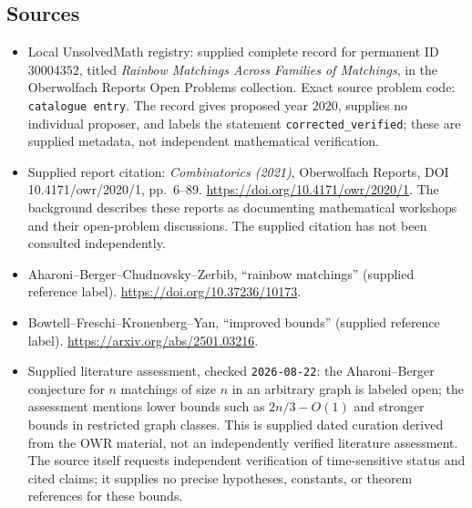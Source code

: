 \documentclass[11pt]{article}
\begin{document}
\subsection{Sources}
\begin{itemize}
\item Local UnsolvedMath registry: supplied complete record for permanent ID \(30004352\), titled \emph{Rainbow Matchings Across Families of Matchings}, in the Oberwolfach Reports Open Problems collection. Exact source problem code: \texttt{catalogue entry}. The record gives proposed year \(2020\), supplies no individual proposer, and labels the statement \texttt{corrected\_verified}; these are supplied metadata, not independent mathematical verification.
\item Supplied report citation: \emph{Combinatorics (2021)}, Oberwolfach Reports, DOI 10.4171/owr/2020/1, pp.\ 6--89. \url{https://doi.org/10.4171/owr/2020/1}. The background describes these reports as documenting mathematical workshops and their open-problem discussions. The supplied citation has not been consulted independently.
\item Aharoni--Berger--Chudnovsky--Zerbib, ``rainbow matchings'' (supplied reference label). \url{https://doi.org/10.37236/10173}.
\item Bowtell--Freschi--Kronenberg--Yan, ``improved bounds'' (supplied reference label). \url{https://arxiv.org/abs/2501.03216}.
\item Supplied literature assessment, checked \texttt{2026-08-22}: the Aharoni--Berger conjecture for \(n\) matchings of size \(n\) in an arbitrary graph is labeled open; the assessment mentions lower bounds such as \(2n/3-O(1)\) and stronger bounds in restricted graph classes. This is supplied dated curation derived from the OWR material, not an independently verified literature assessment. The source itself requests independent verification of time-sensitive status and cited claims; it supplies no precise hypotheses, constants, or theorem references for these bounds.
\end{itemize}
\end{document}
